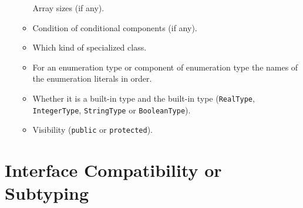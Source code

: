 \begin{itemize}
\begin{itemize}
    Array sizes (if any).
  \item
    Condition of conditional components (if any).
  \item
    Which kind of specialized class.
  \item
    For an enumeration type or component of enumeration type the names
    of the enumeration literals in order.
  \item
    Whether it is a built-in type and the built-in type (\lstinline!RealType!,
    \lstinline!IntegerType!, \lstinline!StringType! or \lstinline!BooleanType!).
  \item
    Visibility (\lstinline!public! or \lstinline!protected!).
  \end{itemize}
\end{itemize}

\section{Interface Compatibility or Subtyping}

